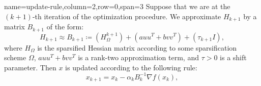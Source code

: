 {name=update-rule,column=2,row=0,span=3}
{
    Suppose that we are at the $(k+1)$-th iteration of the optimization procedure. We approximate $H_{k+1}$ by a matrix $B_{k+1}$ of the form:
    \begin{equation*}
    \label{eq:BFGS-update}
        H_{k+1} \approx B_{k+1} \coloneqq (H_{\Omega}^{k+1}) + (auu^T + bvv^T) + (\tau_{k+1} I),
    \end{equation*}
    where $H_{\Omega}$ is the sparsified Hessian matrix according to some sparsification scheme $\Omega$, $auu^T+bvv^T$ is a rank-two approximation term, and $\tau>0$ is a shift parameter. Then $x$ is updated according to the following rule:
    \[
    x_{k+1}=x_k-\alpha_k B_k^{-1}\nabla f(x_k),
    \]
}
